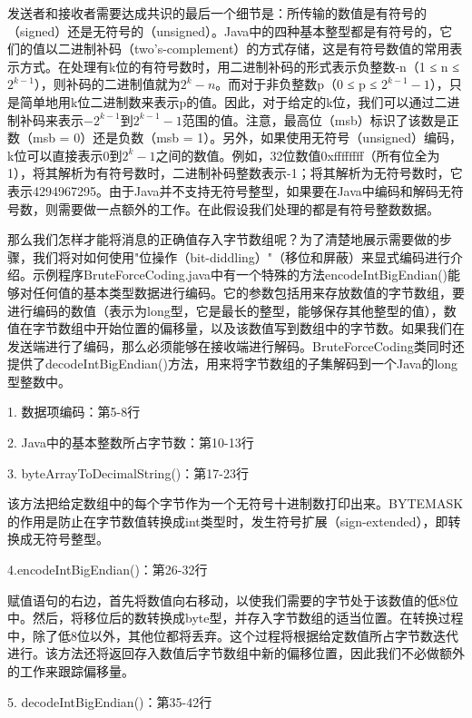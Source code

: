 		发送者和接收者需要达成共识的最后一个细节是：所传输的数值是有符号的（signed）还是无符号的（unsigned）。Java中的四种基本整型都是有符号的，它们的值以二进制补码（two's-complement）的方式存储，这是有符号数值的常用表示方式。在处理有k位的有符号数时，用二进制补码的形式表示负整数-n（1 ≤ n ≤ $2^{k-1}$），则补码的二进制值就为$2^k-n$。而对于非负整数p（0 ≤ p ≤ $2^{k-1}-1$），只是简单地用k位二进制数来表示p的值。因此，对于给定的k位，我们可以通过二进制补码来表示$-2^{k-1}$到$2^{k-1}-1$范围的值。注意，最高位（msb）标识了该数是正数（msb = 0）还是负数（msb = 1）。另外，如果使用无符号（unsigned）编码，k位可以直接表示0到$2^k-1$之间的数值。例如，32位数值0xffffffff（所有位全为1），将其解析为有符号数时，二进制补码整数表示-1；将其解析为无符号数时，它表示4294967295。由于Java并不支持无符号整型，如果要在Java中编码和解码无符号数，则需要做一点额外的工作。在此假设我们处理的都是有符号整数数据。 

		那么我们怎样才能将消息的正确值存入字节数组呢？为了清楚地展示需要做的步骤，我们将对如何使用"位操作（bit-diddling）"（移位和屏蔽）来显式编码进行介绍。示例程序BruteForceCoding.java中有一个特殊的方法encodeIntBigEndian()能够对任何值的基本类型数据进行编码。它的参数包括用来存放数值的字节数组，要进行编码的数值（表示为long型，它是最长的整型，能够保存其他整型的值），数值在字节数组中开始位置的偏移量，以及该数值写到数组中的字节数。如果我们在发送端进行了编码，那么必须能够在接收端进行解码。BruteForceCoding类同时还提供了decodeIntBigEndian()方法，用来将字节数组的子集解码到一个Java的long型整数中。 

		

		1. 数据项编码：第5-8行 

		2. Java中的基本整数所占字节数：第10-13行 

		3. byteArrayToDecimalString()：第17-23行 

		该方法把给定数组中的每个字节作为一个无符号十进制数打印出来。BYTEMASK的作用是防止在字节数值转换成int类型时，发生符号扩展（sign-extended），即转换成无符号整型。 

		4.encodeIntBigEndian()：第26-32行 

		赋值语句的右边，首先将数值向右移动，以使我们需要的字节处于该数值的低8位中。然后，将移位后的数转换成byte型，并存入字节数组的适当位置。在转换过程中，除了低8位以外，其他位都将丢弃。这个过程将根据给定数值所占字节数迭代进行。该方法还将返回存入数值后字节数组中新的偏移位置，因此我们不必做额外的工作来跟踪偏移量。 

		5. decodeIntBigEndian()：第35-42行 

